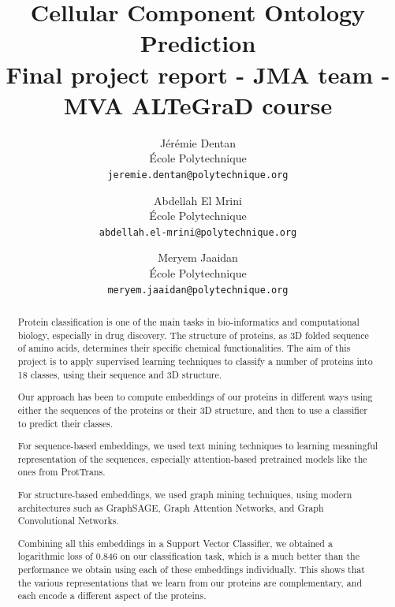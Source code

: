 \documentclass[final]{cvpr}
\begin{document}
\title{Cellular Component Ontology Prediction \\ \small{Final project report - JMA team - MVA ALTeGraD course}}

\author{Jérémie Dentan\\
École Polytechnique\\
{\tt\small jeremie.dentan@polytechnique.org}
\and
Abdellah El Mrini\\
École Polytechnique\\
{\tt\small abdellah.el-mrini@polytechnique.org}
\and
Meryem Jaaidan\\
École Polytechnique\\
{\tt\small meryem.jaaidan@polytechnique.org}
}

\maketitle


\begin{abstract}

Protein classification is one of the main tasks in bio-informatics and computational biology, especially in drug discovery. The structure of proteins, as 3D folded sequence of amino acids, determines their specific chemical functionalities. The aim of this project is to apply supervised learning techniques to classify a number of proteins into 18 classes, using their sequence and 3D structure. 

Our approach has been to compute embeddings of our proteins in different ways using either the sequences of the proteins or their 3D structure, and then to use a classifier to predict their classes.

For sequence-based embeddings, we used text mining techniques to learning meaningful representation of the sequences, especially attention-based pretrained models like the ones from ProtTrans.

For structure-based embeddings, we used graph mining techniques, using modern architectures such as GraphSAGE, Graph Attention Networks, and Graph Convolutional Networks. 

Combining all this embeddings in a Support Vector Classifier, we obtained a logarithmic loss of 0.846 on our classification task, which is a much better than the performance we obtain using each of these embeddings individually. This shows that the various representations that we learn from our proteins are complementary, and each encode a different aspect of the proteins.

\end{abstract}
\end{document}
